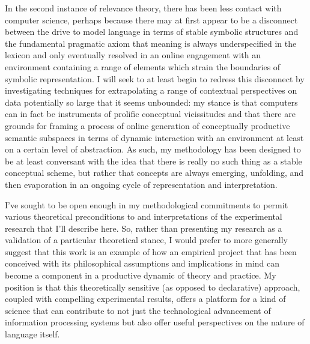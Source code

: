 In the second instance of relevance theory, there has been less contact with computer science, perhaps because there may at first appear to be a disconnect between the drive to model language in terms of stable symbolic structures and the fundamental pragmatic axiom that meaning is always underspecified in the lexicon and only eventually resolved in an online engagement with an environment containing a range of elements which strain the boundaries of symbolic representation.  I will seek to at least begin to redress this disconnect by investigating techniques for extrapolating a range of contextual perspectives on data potentially so large that it seems unbounded: my stance is that computers can in fact be instruments of prolific conceptual vicissitudes and that there are grounds for framing a process of online generation of conceptually productive semantic subspaces in terms of dynamic interaction with an environment at least on a certain level of abstraction.  As such, my methodology has been designed to be at least conversant with the idea that there is really no such thing as a stable conceptual scheme, but rather that concepts are always emerging, unfolding, and then evaporation in an ongoing cycle of representation and interpretation.


  I've sought to be open enough in my methodological commitments to permit various theoretical preconditions to and interpretations of the experimental research that I'll describe here.  So, rather than presenting my research as a validation of a particular theoretical stance, I would prefer to more generally suggest that this work is an example of how an empirical project that has been conceived with its philosophical assumptions and implications in mind can become a component in a productive dynamic of theory and practice.  My position is that this theoretically sensitive (as opposed to declarative) approach, coupled with compelling experimental results, offers a platform for a kind of science that can contribute to not just the technological advancement of information processing systems but also offer useful perspectives on the nature of language itself.

